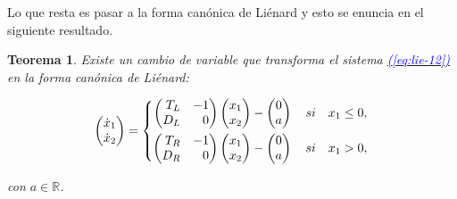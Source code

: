 \documentclass[12pt,a4paper]{report} %
\newtheorem{theorem}{Teorema}[chapter]
\newcommand{\eref}[1]{\hyperref[#1]{\textcolor{blue}{(\ref*{#1})}}}
\newcommand{\eref}[1]{\hyperref[#1]{\textcolor{blue}{\textit{(\ref*{#1})}}}}
\begin{document}
	\vspace{0.5cm} Lo que resta es pasar a la forma canónica de Liénard y esto se enuncia en el siguiente resultado.
	

	
	\vspace{0.5cm}\begin{theorem}\label{t2}
		Existe un cambio de variable que transforma el sistema \eref{eq:lie-12} en la forma canónica de Liénard:
	
	\begin{equation}
		\begin{pmatrix*}[r]
			\dot{x}_1 \\ \dot{x}_2
		\end{pmatrix*}=
		\label{eq:lienard}
		\scalebox{1}{$\displaystyle
			\left\{
			\begin{aligned}
				\begin{pmatrix*}[r]
					T_L & -1\\
					D_L & 0
				\end{pmatrix*}\begin{pmatrix*}[r]
				x_1\\x_2
				\end{pmatrix*}-\begin{pmatrix}
				0\\a
				\end{pmatrix} \quad si \quad x_1\leq 0, \\
				\begin{pmatrix*}[r]
					T_R & -1\\
					D_R & 0
				\end{pmatrix*}\begin{pmatrix*}[r]
				x_1\\x_2
				\end{pmatrix*}-\begin{pmatrix}
					0\\a
				\end{pmatrix} \quad si \quad x_1 > 0,
			\end{aligned}
			\right.
			$}
	\end{equation}
	
	\noindent con $a\in \mathbb{R}$.
	\end{theorem}
\end{document}
